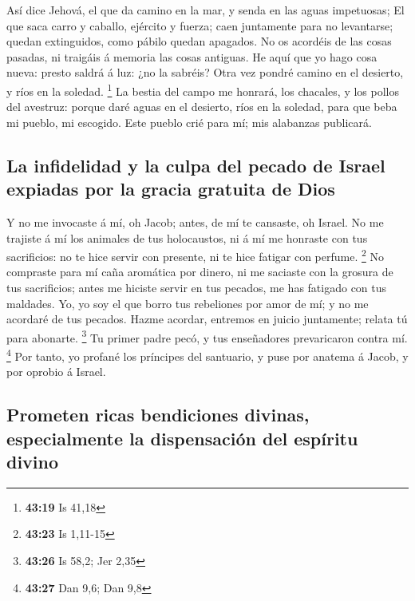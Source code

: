  Así dice Jehová, el que da camino en la mar, y senda en
las aguas impetuosas;  El que saca carro y caballo,
ejército y fuerza; caen juntamente para no levantarse; quedan
extinguidos, como pábilo quedan apagados.  No os acordéis
de las cosas pasadas, ni traigáis á memoria las cosas antiguas.
 He aquí que yo hago cosa nueva: presto saldrá á luz: ¿no
la sabréis? Otra vez pondré camino en el desierto, y ríos en la soledad.
\footnote{\textbf{43:19} Is 41,18}  La bestia del campo
me honrará, los chacales, y los pollos del avestruz: porque daré aguas
en el desierto, ríos en la soledad, para que beba mi pueblo, mi
escogido.  Este pueblo crié para mí; mis alabanzas
publicará.

\hypertarget{la-infidelidad-y-la-culpa-del-pecado-de-israel-expiadas-por-la-gracia-gratuita-de-dios}{%
\subsection{La infidelidad y la culpa del pecado de Israel expiadas por
la gracia gratuita de
Dios}\label{la-infidelidad-y-la-culpa-del-pecado-de-israel-expiadas-por-la-gracia-gratuita-de-dios}}

 Y no me invocaste á mí, oh Jacob; antes, de mí te
cansaste, oh Israel.  No me trajiste á mí los animales de
tus holocaustos, ni á mí me honraste con tus sacrificios: no te hice
servir con presente, ni te hice fatigar con perfume. \footnote{\textbf{43:23}
  Is 1,11-15}  No compraste para mí caña aromática por
dinero, ni me saciaste con la grosura de tus sacrificios; antes me
hiciste servir en tus pecados, me has fatigado con tus maldades.
 Yo, yo soy el que borro tus rebeliones por amor de mí; y
no me acordaré de tus pecados.  Hazme acordar, entremos
en juicio juntamente; relata tú para abonarte. \footnote{\textbf{43:26}
  Is 58,2; Jer 2,35}  Tu primer padre pecó, y tus
enseñadores prevaricaron contra mí. \footnote{\textbf{43:27} Dan 9,6;
  Dan 9,8}  Por tanto, yo profané los príncipes del
santuario, y puse por anatema á Jacob, y por oprobio á Israel.

\hypertarget{prometen-ricas-bendiciones-divinas-especialmente-la-dispensaciuxf3n-del-espuxedritu-divino}{%
\subsection{Prometen ricas bendiciones divinas, especialmente la
dispensación del espíritu
divino}\label{prometen-ricas-bendiciones-divinas-especialmente-la-dispensaciuxf3n-del-espuxedritu-divino}}

